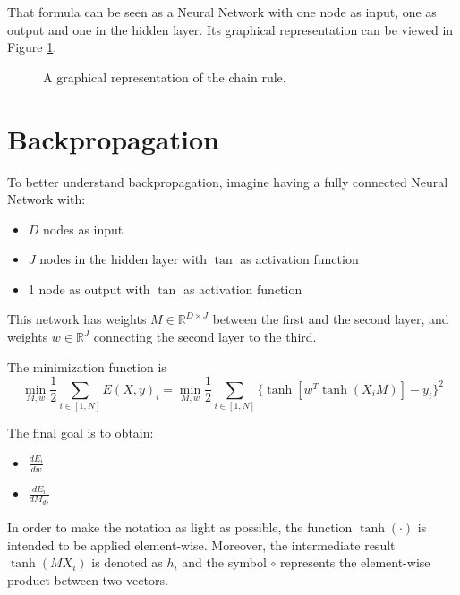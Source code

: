 That formula can be seen as a Neural Network with one node as input, one as output and one in the hidden layer.
Its graphical representation can be viewed in Figure \ref{fig:nn-chain}.

\begin{figure}[h]
    \centering
    \caption{A graphical representation of the chain rule.}
    \label{fig:nn-chain}
\end{figure}

\section{Backpropagation}
To better understand backpropagation, imagine having a fully connected Neural Network with:
\begin{itemize}
    \item $D$ nodes as input
    \item $J$ nodes in the hidden layer with $\tan$ as activation function
    \item 1 node as output with $\tan$ as activation function
\end{itemize}

This network has weights $M \in \mathbb{R}^{D \times J}$ between the first and the second layer,
and weights $w \in \mathbb{R}^{J} $ connecting the second layer to the third.

The minimization function is
\[\displaystyle \min_{M, w} \frac{1}{2} \sum_{i \in [1, N]} E(X, y)_i =
    \min_{M, w} \frac{1}{2} \sum_{i \in [1, N]} \{ \tanh[w^T \tanh(X_i M)] - y_i\}^2 \]

The final goal is to obtain:
\begin{multicols}{2}
    \begin{itemize}
        \item $\displaystyle \frac{dE_i}{dw}$
        \item $\displaystyle \frac{dE_i}{dM_{dj}}$
    \end{itemize}
\end{multicols}

In order to make the notation as light as possible, the function $\tanh(\cdot)$ is intended to be applied element-wise.
Moreover, the intermediate result $\tanh(M X_i)$ is denoted as $h_i$ and the symbol $\circ$ represents the element-wise product between two vectors.

